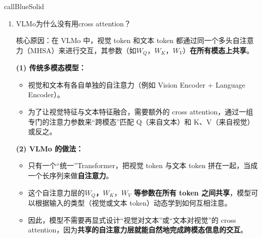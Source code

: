 \documentclass[zihao=false,fontset=windows]{ctexart}
\newcommand{\yel}[1]{\colorbox{hiYellow}{#1}}
\begin{document}
\begin{feishubox}{callBlueSolid}{🙋}
\begin{enumerate}
\item \yel{VLMo为什么没有用cross attention？}\par
核心原因：在 VLMo 中，视觉 token 和文本 token 都通过同一个多头自注意力（MHSA）来进行交互，其参数（如$W_Q$，$W_K$，$W_V$）\textbf{在所有模态上共享}。\par
\textbf{(1) 传统多模态模型：}\par
\begin{itemize}
\item 视觉和文本有各自单独的自注意力（例如 Vision Encoder + Language Encoder）。
\item 为了让视觉特征与文本特征融合，需要额外的 cross attention，通过一组专门的注意力参数来“跨模态”匹配 Q（来自文本）和 K、V（来自视觉）或反之。
\end{itemize}
\textbf{(2) VLMo 的做法：}\par
\begin{itemize}
\item 只有一个“统一”Transformer，把视觉 token 与文本 token 拼在一起，当成一个长序列来做\textbf{自注意力}。
\item 这个自注意力层的\textbf{$W_Q$，}$\textbf{$W_K$，}$\textbf{$W_V$ 等参数在所有 token 之间共享}，模型可以根据输入的类型（视觉或文本 token）动态学到如何互相注意。
\item 因此，模型不需要再显式设计“视觉对文本”或“文本对视觉”的 cross attention，因为\textbf{共享的自注意力层就能自然地完成跨模态信息的交互}。
\end{itemize}
\end{enumerate}
\end{feishubox}
\end{document}
